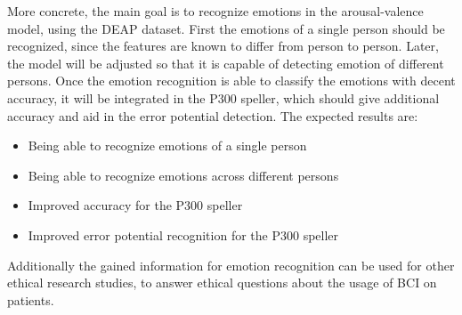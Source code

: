 More concrete, the main goal is to recognize emotions in the arousal-valence model, using the DEAP dataset. First the emotions of a single person should be recognized, since the features are known to differ from person to person. Later, the model will be adjusted so that it is capable of detecting emotion of different persons. Once the emotion recognition is able to classify the emotions with decent accuracy, it will be integrated in the P300 speller, which should give additional accuracy and aid in the error potential detection. The expected results are:
\begin{itemize}
\item Being able to recognize emotions of a single person
\item Being able to recognize emotions across different persons
\item Improved accuracy for the P300 speller
\item Improved error potential recognition for the P300 speller
\end{itemize}

\npar

Additionally the gained information for emotion recognition can be used for other ethical research studies, to answer ethical questions about the usage of BCI on patients.